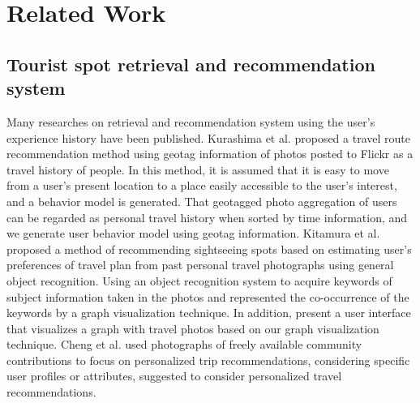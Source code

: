 \documentclass[journal]{IAENGtran}
\begin{document}
\section{Related Work}
\label{sec:Related Work}
\subsection{Tourist spot retrieval and recommendation system}
\label{subsec:Tourist spot retrieval and recommendation system}
Many researches on retrieval and recommendation system using the user's experience history have been published.
Kurashima et al.\cite{Codd01} proposed a travel route recommendation method using geotag information of photos posted to Flickr as a travel history of people.
In this method, it is assumed that it is easy to move from a user's present location to a place easily accessible to the user's interest, and a behavior model is generated.
That geotagged photo aggregation of users can be regarded as personal travel history when sorted by time information, and we generate user behavior model using geotag information.
Kitamura et al.\cite{Codd02} proposed a method of recommending sightseeing spots based on estimating user's preferences of travel plan from past personal travel photographs using general object recognition.
Using an object recognition system to acquire keywords of subject information taken in the photos and represented the co-occurrence of the keywords by a graph visualization technique.
In addition, present a user interface that visualizes a graph with travel photos based on our graph visualization technique.
Cheng et al.\cite{Codd03} used photographs of freely available community contributions to focus on personalized trip recommendations, considering specific user profiles or attributes, suggested to consider personalized travel recommendations.
\end{document}
